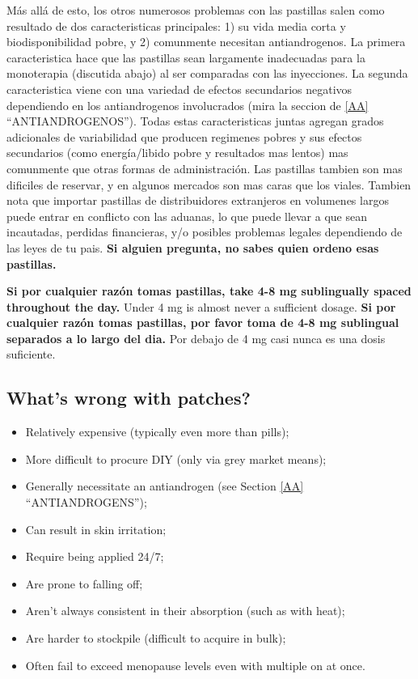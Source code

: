 \documentclass{article}
\begin{document}
Más allá de esto, los otros numerosos problemas con las pastillas salen como resultado de dos caracteristicas principales: 1) su vida media corta y biodisponibilidad pobre, y 2) comunmente necesitan antiandrogenos. La primera caracteristica hace que las pastillas sean largamente inadecuadas para la monoterapia (discutida abajo) al ser comparadas con las inyecciones. La segunda caracteristica viene con una variedad de efectos secundarios negativos dependiendo en los antiandrogenos involucrados (mira la seccion de \ref{AA} “ANTIANDROGENOS”). Todas estas caracteristicas juntas agregan grados adicionales de variabilidad que producen regimenes pobres y sus efectos secundarios (como energía/libido pobre y resultados mas lentos) mas comunmente que otras formas de administración. Las pastillas tambien son mas dificiles de reservar, y en algunos mercados son mas caras que los viales. Tambien nota que importar pastillas de distribuidores extranjeros en volumenes largos puede entrar en conflicto con las aduanas, lo que puede llevar a que sean incautadas, perdidas financieras, y/o posibles problemas legales dependiendo de las leyes de tu pais. \textbf{Si alguien pregunta, no sabes quien ordeno esas pastillas.}

\textbf{Si por cualquier razón tomas pastillas, take 4-8 mg sublingually spaced throughout the day.} Under 4 mg is almost never a sufficient dosage.
\textbf{Si por cualquier razón tomas pastillas, por favor toma de 4-8 mg sublingual separados a lo largo del dia.} Por debajo de 4 mg casi nunca es una dosis suficiente.

\subsection{What’s wrong with patches?}

\begin{itemize}
  \item Relatively expensive (typically even more than pills);
  \item More difficult to procure DIY (only via grey market means);
  \item Generally necessitate an antiandrogen (see Section \ref{AA} “ANTIANDROGENS”);
  \item Can result in skin irritation;
  \item Require being applied 24/7;
  \item Are prone to falling off;
  \item Aren’t always consistent in their absorption (such as with heat);
  \item Are harder to stockpile (difficult to acquire in bulk);
  \item Often fail to exceed menopause levels even with multiple on at once.
\end{itemize}
\end{document}
